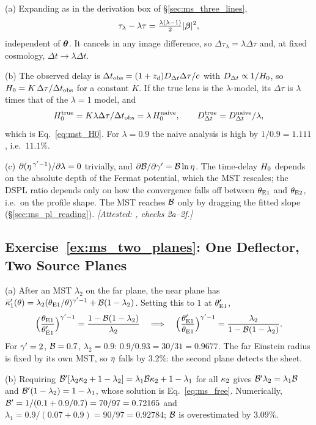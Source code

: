 (a) Expanding as in the derivation box of \S\ref{sec:ms_three_lines},
\[
\tau_\lambda-\lambda\tau=\tfrac{\lambda(\lambda-1)}{2}|\boldsymbol{\beta}|^2 ,
\]
independent of $\boldsymbol{\theta}$.  It cancels in any image difference, so
$\Delta\tau_\lambda=\lambda\Delta\tau$ and, at fixed cosmology,
$\Delta t\to\lambda\Delta t$.

(b) The observed delay is
$\Delta t_{\rm obs}=(1+z_d)D_{\Delta t}\Delta\tau/c$ with $D_{\Delta t}\propto1/H_0$,
so $H_0=K\,\Delta\tau/\Delta t_{\rm obs}$ for a constant $K$.  If the true
lens is the $\lambda$-model, its $\Delta\tau$ is $\lambda$ times that of the
$\lambda=1$ model, and
\[
H_0^{\rm true}=K\lambda\Delta\tau/\Delta t_{\rm obs}=\lambda\,H_0^{\rm naive},
\qquad D_{\Delta t}^{\rm true}=D_{\Delta t}^{\rm naive}/\lambda ,
\]
which is Eq.~\eqref{eq:mst_H0}.  For $\lambda=0.9$ the naive analysis is high by
$1/0.9=1.111$, i.e.\ $11.1\%$.

(c) $\partial(\eta^{\,\gamma'-1})/\partial\lambda=0$ trivially, and
$\partial\mathcal{B}/\partial\gamma'=\mathcal{B}\ln\eta$.  The time-delay $H_0$ depends
on the absolute depth of the Fermat potential, which the MST rescales; the DSPL
ratio depends only on how the convergence falls off between $\theta_{\rm E1}$
and $\theta_{\rm E2}$, i.e.\ on the profile shape.  The MST reaches $\mathcal{B}$ only
by dragging the fitted slope (\S\ref{sec:ms_pl_reading}).
\emph{[Attested: , checks 2a--2f.]}

\subsection*{Exercise~\ref{ex:ms_two_planes}: One Deflector, Two Source Planes}

(a) After an MST $\lambda_2$ on the far plane, the near plane has
$\bar{\kappa}_1'(\theta)=\lambda_2(\theta_{\rm E1}/\theta)^{\gamma'-1}+\mathcal{B}(1-\lambda_2)$.
Setting this to $1$ at $\theta_{\rm E1}'$,
\[
\Bigl(\frac{\theta_{\rm E1}}{\theta_{\rm E1}'}\Bigr)^{\gamma'-1}=\frac{1-\mathcal{B}(1-\lambda_2)}{\lambda_2}
\quad\Longrightarrow\quad
\Bigl(\frac{\theta_{\rm E1}'}{\theta_{\rm E1}}\Bigr)^{\gamma'-1}=\frac{\lambda_2}{1-\mathcal{B}(1-\lambda_2)} .
\]
For $\gamma'=2$, $\mathcal{B}=0.7$, $\lambda_2=0.9$: $0.9/0.93=30/31=0.9677$.  The far
Einstein radius is fixed by its own MST, so $\eta$ falls by $3.2\%$: the
second plane detects the sheet.

(b) Requiring
$\mathcal{B}'[\lambda_2\kappa_2+1-\lambda_2]=\lambda_1\mathcal{B}\kappa_2+1-\lambda_1$ for
all $\kappa_2$ gives $\mathcal{B}'\lambda_2=\lambda_1\mathcal{B}$ and
$\mathcal{B}'(1-\lambda_2)=1-\lambda_1$, whose solution is Eq.~\eqref{eq:ms_free}.
Numerically, $\mathcal{B}'=1/(0.1+0.9/0.7)=70/97=0.72165$ and
$\lambda_1=0.9/(0.07+0.9)=90/97=0.92784$; $\mathcal{B}$ is overestimated by $3.09\%$.

